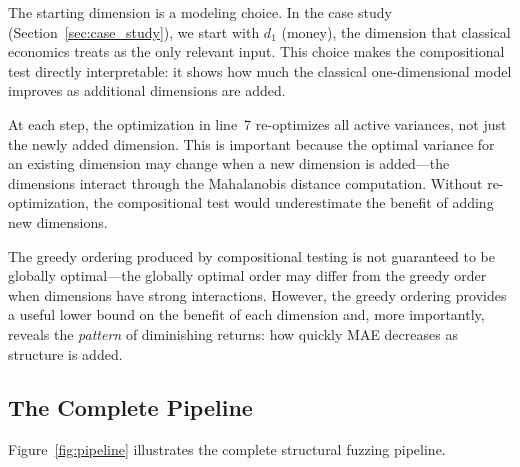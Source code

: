 \documentclass[12pt]{article}
\begin{document}
The starting dimension is a modeling choice.  In the case study (Section~\ref{sec:case_study}), we start with $d_1$ (money), the dimension that classical economics treats as the only relevant input.  This choice makes the compositional test directly interpretable: it shows how much the classical one-dimensional model improves as additional dimensions are added.

At each step, the optimization in line~7 re-optimizes all active variances, not just the newly added dimension.  This is important because the optimal variance for an existing dimension may change when a new dimension is added---the dimensions interact through the Mahalanobis distance computation.  Without re-optimization, the compositional test would underestimate the benefit of adding new dimensions.

The greedy ordering produced by compositional testing is not guaranteed to be globally optimal---the globally optimal order may differ from the greedy order when dimensions have strong interactions.  However, the greedy ordering provides a useful lower bound on the benefit of each dimension and, more importantly, reveals the \emph{pattern} of diminishing returns: how quickly MAE decreases as structure is added.

\subsection{The Complete Pipeline}

Figure~\ref{fig:pipeline} illustrates the complete structural fuzzing pipeline.
\end{document}
